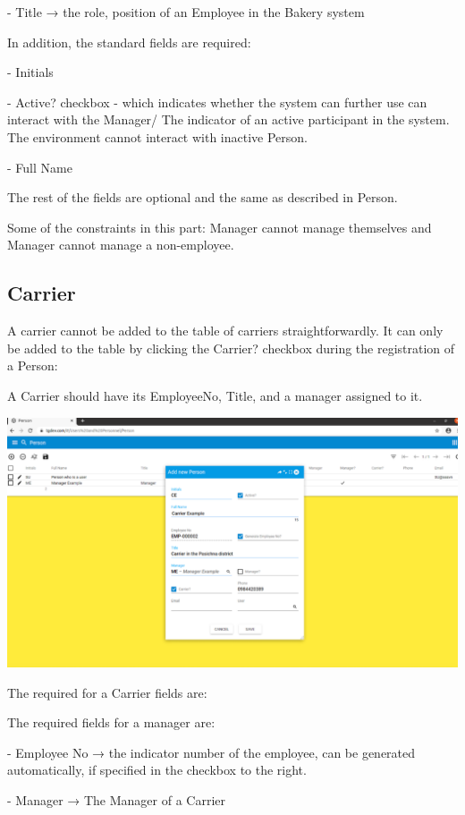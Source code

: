 - Title → the role, position of an Employee in the Bakery system

In addition, the standard fields are required:

- Initials

- Active? checkbox - which indicates whether the system can further use can interact with the Manager/ The indicator of an active participant in the system. The environment cannot interact with inactive Person.

- Full Name

The rest of the fields are optional and the same as described in Person.

Some of the constraints in this part: Manager cannot manage themselves and Manager cannot manage a non-employee.

\subsection{Carrier}

A carrier cannot be added to the table of carriers straightforwardly. It can only be added to the table by clicking the Carrier? checkbox during the registration of a Person:

A Carrier should have its EmployeeNo, Title, and a manager assigned to it. 

\includegraphics[width=\textwidth]{sections/01-chapter/images/carrier1.png}

The required for a Carrier fields are: 

The required fields for a manager are:

- Employee No → the indicator number of the employee, can be generated automatically, if specified in the checkbox to the right.

- Manager → The Manager of a Carrier

